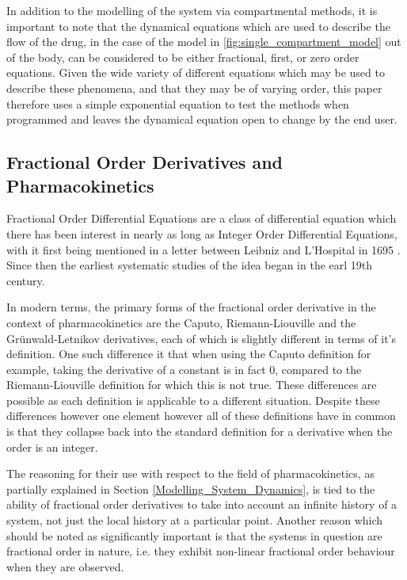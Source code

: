 In addition to the modelling of the system via compartmental methods, it is important to note that the dynamical equations which are used to describe the flow of the drug, in the case of the model in \ref{fig:single_compartment_model} out of the body, can be considered to be either fractional, first, or zero order equations. Given the wide variety of different equations which may be used to describe these phenomena, and that they may be of varying order, this paper therefore uses a simple exponential equation to test the methods when programmed and leaves the dynamical equation open to change by the end user.

\subsection{Fractional Order Derivatives and Pharmacokinetics} \label{fod_and_pharmacokinetics}

Fractional Order Differential Equations are a class of differential equation which there has been interest in nearly as long as Integer Order Differential Equations, with it first being mentioned in a letter between Leibniz and L'Hospital in 1695 \cite{the_fractional_calculus}. Since then the earliest systematic studies of the idea began in the earl 19th century. 

In modern terms, the primary forms of the fractional order derivative in the context of pharmacokinetics are the Caputo, Riemann-Liouville and the Gr\"{u}nwald-Letnikov derivatives, each of which is slightly different in terms of it's definition. One such difference it that when using the Caputo definition for example, taking the derivative of a constant is in fact 0, compared to the Riemann-Liouville definition for which this is not true. These differences are possible as each definition is applicable to a different situation. Despite these differences however one element however all of these definitions have in common is that they collapse back into the standard definition for a derivative when the order is an integer. 

The reasoning for their use with respect to the field of pharmacokinetics, as partially explained in Section \ref{Modelling_System_Dynamics}, is tied to the ability of fractional order derivatives to take into account an infinite history of a system, not just the local history at a particular point. Another reason which should be noted as significantly important is that the systems in question are fractional order in nature, i.e. they exhibit non-linear fractional order behaviour when they are observed.

